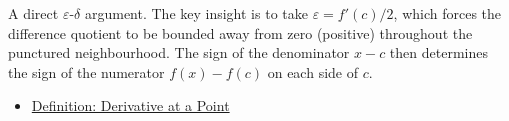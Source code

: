 \begin{remark*}
A direct $\varepsilon$-$\delta$ argument. The key insight is to take $\varepsilon = f'(c)/2$, which forces the difference quotient to be bounded away from zero (positive) throughout the punctured neighbourhood. The sign of the denominator $x - c$ then determines the sign of the numerator $f(x) - f(c)$ on each side of $c$.
\end{remark*}

\begin{dependencies}
\begin{itemize}
  \item \hyperref[def:derivative-at-a-point]{Definition: Derivative at a Point}
\end{itemize}
\end{dependencies}

\clearpage
